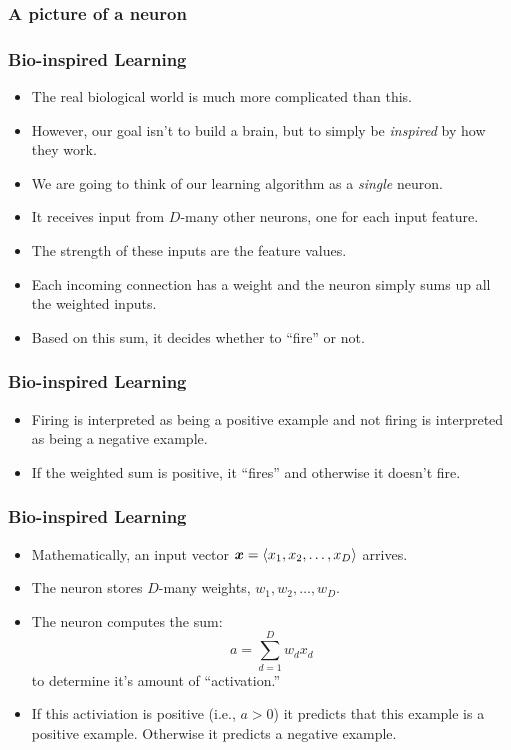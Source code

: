 \documentclass[trans]{beamer}
\begin{document}
\begin{frame}
\frametitle{A picture of a neuron}
\end{frame}

\begin{frame}
  \frametitle{Bio-inspired Learning}
\begin{itemize}
\item The real biological world is much more complicated than this.
\item However, our goal isn't to build a brain, but to simply be
\emph{inspired} by how they work. 
\item We are going to think of our
learning algorithm as a \emph{single} neuron. 
\item It receives input from
$D$-many other neurons, one for each input feature.  
\item The strength of
these inputs are the feature values.  
\item Each incoming connection has a weight
and the neuron simply sums up all the weighted inputs.
\item  Based on this
sum, it decides whether to ``fire'' or not.
\end{itemize}
\end{frame}
\begin{frame}
  \frametitle{Bio-inspired Learning}
\begin{itemize}
\item  Firing is interpreted as
being a positive example and not firing is interpreted as being a
negative example. 
\item If the weighted sum is positive, it
``fires'' and otherwise it doesn't fire.
\end{itemize}
\end{frame}
\begin{frame}
  \frametitle{Bio-inspired Learning}
\begin{itemize}
\item
Mathematically, an input vector ${\boldsymbol{x}} = \langle x_1, x_2, \dots, x_D
\rangle$ arrives. 
\item The neuron stores $D$-many weights, $w_1, w_2,
\dots, w_D$.  
\item The neuron computes the sum:
\begin{equation} \label{eq:perc:sum}
a = \sum_{d=1}^D w_d x_d
\end{equation}
to determine it's amount of ``activation.''
\item  If this activiation is
positive (i.e., $a > 0$) it predicts that this example is a positive
example.  Otherwise it predicts a negative example.
\end{itemize}
\end{frame}
\end{document}
